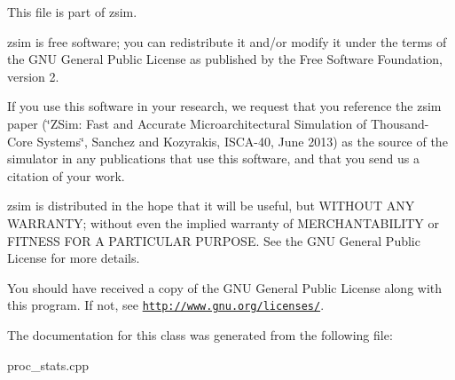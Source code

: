 This file is part of zsim.

zsim is free software; you can redistribute it and/or modify it under the terms of the G\-N\-U General Public License as published by the Free Software Foundation, version 2.

If you use this software in your research, we request that you reference the zsim paper (\char`\"{}\-Z\-Sim\-: Fast and Accurate Microarchitectural Simulation of
\-Thousand-\/\-Core Systems\char`\"{}, Sanchez and Kozyrakis, I\-S\-C\-A-\/40, June 2013) as the source of the simulator in any publications that use this software, and that you send us a citation of your work.

zsim is distributed in the hope that it will be useful, but W\-I\-T\-H\-O\-U\-T A\-N\-Y W\-A\-R\-R\-A\-N\-T\-Y; without even the implied warranty of M\-E\-R\-C\-H\-A\-N\-T\-A\-B\-I\-L\-I\-T\-Y or F\-I\-T\-N\-E\-S\-S F\-O\-R A P\-A\-R\-T\-I\-C\-U\-L\-A\-R P\-U\-R\-P\-O\-S\-E. See the G\-N\-U General Public License for more details.

You should have received a copy of the G\-N\-U General Public License along with this program. If not, see \href{http://www.gnu.org/licenses/}{\tt http\-://www.\-gnu.\-org/licenses/}. 

The documentation for this class was generated from the following file\-:\begin{DoxyCompactItemize}
\item 
proc\-\_\-stats.\-cpp\end{DoxyCompactItemize}
